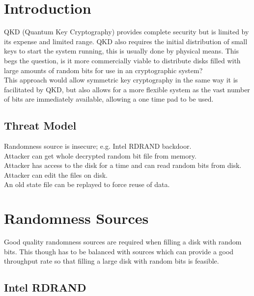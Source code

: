 \documentclass{paper}
\author{Daniel A D Horbury, }
\begin{document}
	\maketitle
	\section{Introduction} %
		QKD (Quantum Key Cryptography) provides complete security but is limited by its expense and limited range. QKD also requires the initial distribution of small keys to start the system running, this is usually done by physical means. This begs the question, is it more commercially viable to distribute disks filled with large amounts of random bits for use in an cryptographic system?\\
		This approach would allow symmetric key cryptography in the same way it is facilitated by QKD, but also allows for a more flexible system as the vast number of bits are immediately available, allowing a one time pad to be used.\\

	\subsection{Threat Model} %
			Randomness source is insecure; e.g. Intel RDRAND backdoor.\\
			Attacker can get whole decrypted random bit file from memory.\\
			Attacker has access to the disk for a time and can read random bits from disk.\\
			Attacker can edit the files on disk.\\
			An old state file can be replayed to force reuse of data.\\
	
	
	\section{Randomness Sources}
		Good quality randomness sources are required when filling a disk with random bits. This though has to be balanced with sources which can provide a good throughput rate so that filling a large disk with random bits is feasible.\\ 
	
		\subsection{Intel RDRAND}
\end{document}
